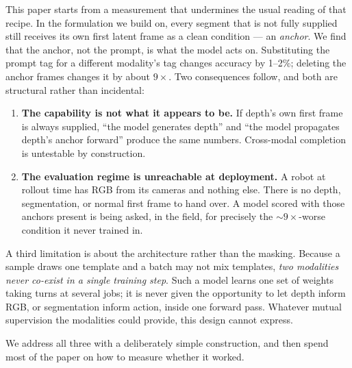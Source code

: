 \documentclass{article}
\begin{document}
This paper starts from a measurement that undermines the usual reading of that recipe. In the
formulation we build on, every segment that is not fully supplied still receives its own first
latent frame as a clean condition --- an \emph{anchor}. We find that the anchor, not the prompt,
is what the model acts on. Substituting the prompt tag for a different modality's tag changes
accuracy by 1--2\%; deleting the anchor frames changes it by about $9\times$. Two consequences
follow, and both are structural rather than incidental:

\begin{enumerate}
\item \textbf{The capability is not what it appears to be.} If depth's own first frame is always
      supplied, ``the model generates depth'' and ``the model propagates depth's anchor forward''
      produce the same numbers. Cross-modal completion is untestable by construction.
\item \textbf{The evaluation regime is unreachable at deployment.} A robot at rollout time has
      RGB from its cameras and nothing else. There is no depth, segmentation, or normal first
      frame to hand over. A model scored with those anchors present is being asked, in the field,
      for precisely the $\sim\!9\times$-worse condition it never trained in.
\end{enumerate}

A third limitation is about the architecture rather than the masking. Because a sample draws one
template and a batch may not mix templates, \emph{two modalities never co-exist in a single
training step}. Such a model learns one set of weights taking turns at several jobs; it is never
given the opportunity to let depth inform RGB, or segmentation inform action, inside one forward
pass. Whatever mutual supervision the modalities could provide, this design cannot express.

We address all three with a deliberately simple construction, and then spend most of the paper on
how to measure whether it worked.
\end{document}
